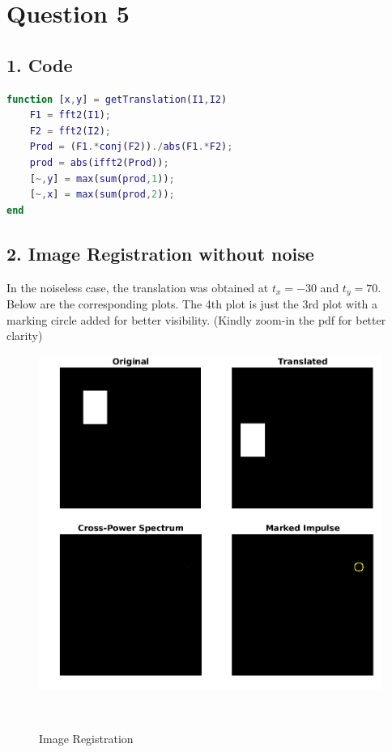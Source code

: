 \documentclass[12pt, a4paper]{article}
\begin{document}
\vspace*{-22pt}
\section*{Question 5}
\subsection*{1. Code}
\begin{lstlisting}[language=Matlab]
function [x,y] = getTranslation(I1,I2)
    F1 = fft2(I1);
    F2 = fft2(I2);
    Prod = (F1.*conj(F2))./abs(F1.*F2);
    prod = abs(ifft2(Prod));
    [~,y] = max(sum(prod,1));
    [~,x] = max(sum(prod,2));
end
\end{lstlisting}
\subsection*{2. Image Registration without noise}
In the noiseless case, the translation was obtained at $t_x = -30$ and $t_y = 70$. \\
Below are the corresponding plots. The 4th plot is just the 3rd plot with a marking circle added for better visibility. (Kindly zoom-in the pdf for better clarity)
\vspace*{65pt}
\begin{figure}[h!]
    \centering
    \renewcommand{\thefigure}{5.1}
    \begin{minipage}[c][1\width]{0.7\textwidth}
    	\hspace*{-0.8in}
    	\includegraphics[width=1.34\textwidth]{noiseless.png}
    	\caption{Image Registration}
	    \label{fig:5.1}
    \end{minipage} \\
\end{figure}
\vspace*{40pt}
\end{document}
